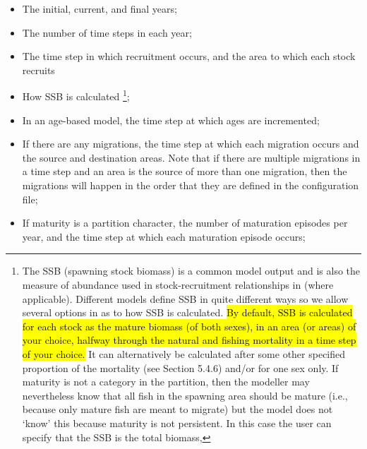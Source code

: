 \begin{itemize}
\item	The initial, current, and final years;
\item	The number of time steps in each year;
\item	The time step in which recruitment occurs, and the area to which each stock recruits
\item	How SSB is calculated \footnote{The SSB (spawning stock biomass) is a common model output and is also the measure of abundance used in stock-recruitment relationships in \cas (where applicable). Different models define SSB in quite different ways so we allow several options in \cas as to how SSB is calculated. \hl{By default, SSB is calculated for each stock as the mature biomass (of both sexes), in an area (or areas) of your choice, halfway through the natural and fishing mortality in a time step of your choice.} It can alternatively be calculated after some other specified proportion of the mortality (see Section 5.4.6) and/or for one sex only.  If maturity is not a category in the partition, then the modeller may nevertheless know that all fish in the spawning area should be mature (i.e., because only mature fish are meant to migrate) but the model does not ‘know’ this because maturity is not persistent. In this case the user can specify that the SSB is the total biomass,};
\item	In an age-based model, the time step at which ages are incremented;
\item	If there are any migrations, the time step at which each migration occurs and the source and destination areas. Note that if there are multiple migrations in a time step and an area is the source of more than one migration, then the migrations will happen in the order that they are defined in the configuration file;
\item	If maturity is a partition character, the number of maturation episodes per year, and the time step at which each maturation episode occurs;

\end{itemize}
